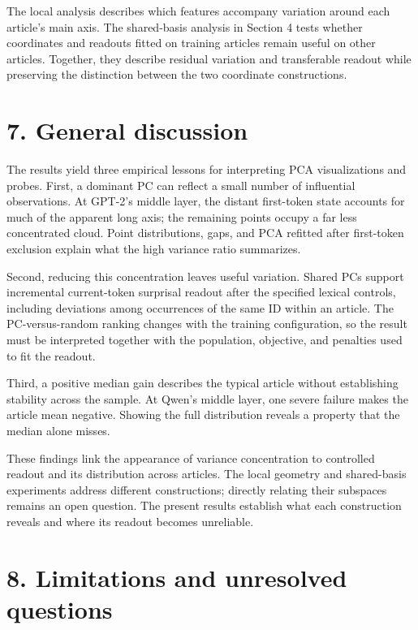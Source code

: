 The local analysis describes which features accompany variation around each article's main axis. The shared-basis analysis in Section 4 tests whether coordinates and readouts fitted on training articles remain useful on other articles. Together, they describe residual variation and transferable readout while preserving the distinction between the two coordinate constructions.

\FloatBarrier

\section{7. General discussion}\label{general-discussion}

The results yield three empirical lessons for interpreting PCA visualizations and probes. First, a dominant PC can reflect a small number of influential observations. At GPT-2's middle layer, the distant first-token state accounts for much of the apparent long axis; the remaining points occupy a far less concentrated cloud. Point distributions, gaps, and PCA refitted after first-token exclusion explain what the high variance ratio summarizes.

Second, reducing this concentration leaves useful variation. Shared PCs support incremental current-token surprisal readout after the specified lexical controls, including deviations among occurrences of the same ID within an article. The PC-versus-random ranking changes with the training configuration, so the result must be interpreted together with the population, objective, and penalties used to fit the readout.

Third, a positive median gain describes the typical article without establishing stability across the sample. At Qwen's middle layer, one severe failure makes the article mean negative. Showing the full distribution reveals a property that the median alone misses.

These findings link the appearance of variance concentration to controlled readout and its distribution across articles. The local geometry and shared-basis experiments address different constructions; directly relating their subspaces remains an open question. The present results establish what each construction reveals and where its readout becomes unreliable.

\FloatBarrier

\section{8. Limitations and unresolved questions}\label{limitations-and-unresolved-questions}

